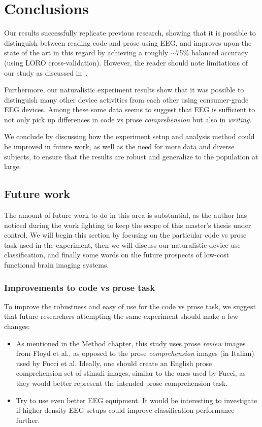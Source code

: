 \chapter{Conclusions}

Our results successfully replicate previous research, showing that it is possible to distinguish between reading code and prose using EEG, and improves upon the state of the art in this regard by achieving a roughly $\sim$75\% balanced accuracy (using LORO cross-validation). However, the reader should note limitations of our study as discussed in~.

Furthermore, our naturalistic experiment results show that it was possible to distinguish many other device activities from each other using consumer-grade EEG devices. Among these some data seems to suggest that EEG is sufficient to not only pick up differences in code vs prose \emph{comprehension} but also in \emph{writing}.

We conclude by discussing how the experiment setup and analysis method could be improved in future work, as well as the need for more data and diverse subjects, to ensure that the results are robust and generalize to the population at large.

\section{Future work}

The amount of future work to do in this area is substantial, as the author has noticed during the work fighting to keep the scope of this master's thesis under control. We will begin this section by focusing on the particular code vs prose task used in the experiment, then we will discuss our naturalistic device use classification, and finally some words on the future prospects of low-cost functional brain imaging systems.

\subsection{Improvements to code vs prose task}

\begin{minipage}{\textwidth}
To improve the robustness and easy of use for the code vs prose task, we suggest that future researchers attempting the same experiment should make a few changes:

\begin{itemize}
    \item As mentioned in the Method chapter, this study uses prose \emph{review} images from Floyd et al., as opposed to the prose \emph{comprehension} images (in Italian) used by Fucci et al. Ideally, one should create an English prose comprehension set of stimuli images, similar to the ones used by Fucci, as they would better represent the intended prose comprehension task.
    \item Try to use even better EEG equipment. It would be interesting to investigate if higher density EEG setups could improve classification performance further.
\end{itemize}
\end{minipage}

